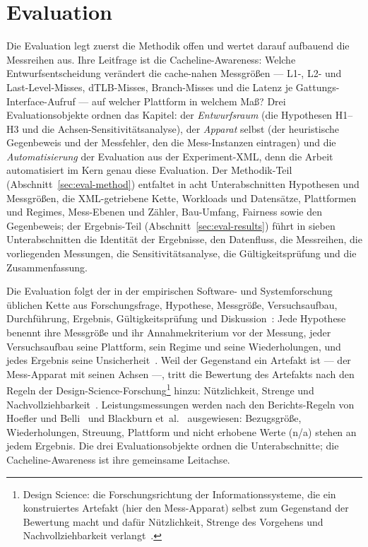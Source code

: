 \chapter{Evaluation}\label{ch:eval}

\begin{nurlang}
Die Evaluation legt zuerst die Methodik offen und wertet darauf aufbauend die Messreihen aus. Ihre
Leitfrage ist die Cacheline-Awareness: Welche Entwurfsentscheidung verändert die cache-nahen
Messgrößen --- L1-, L2- und Last-Level-Misses, dTLB-Misses, Branch-Misses und die Latenz je
Gattungs-Interface-Aufruf --- auf welcher Plattform in welchem Maß? Drei Evaluationsobjekte ordnen das
Kapitel: der \emph{Entwurfsraum} (die Hypothesen H1--H3 und die Achsen-Sensitivitätsanalyse), der
\emph{Apparat} selbst (der heuristische Gegenbeweis und der Messfehler, den die Mess-Instanzen
eintragen) und die \emph{Automatisierung} der Evaluation aus der Experiment-XML, denn die Arbeit
automatisiert im Kern genau diese Evaluation. Der Methodik-Teil (Abschnitt~\ref{sec:eval-method})
entfaltet in acht Unterabschnitten Hypothesen und Messgrößen, die XML-getriebene Kette, Workloads und
Datensätze, Plattformen und Regimes, Mess-Ebenen und Zähler, Bau-Umfang, Fairness sowie den
Gegenbeweis; der Ergebnis-Teil (Abschnitt~\ref{sec:eval-results}) führt in sieben Unterabschnitten
die Identität der Ergebnisse, den Datenfluss, die Messreihen, die vorliegenden Messungen, die
Sensitivitätsanalyse, die Gültigkeitsprüfung und die Zusammenfassung.

Die Evaluation folgt der in der empirischen Software- und Systemforschung üblichen Kette aus
Forschungsfrage, Hypothese, Messgröße, Versuchsaufbau, Durchführung, Ergebnis, Gültigkeitsprüfung
und Diskussion~\cite{wohlin2012experimentation,shaw2003writing}: Jede Hypothese benennt ihre
Messgröße und ihr Annahmekriterium vor der Messung, jeder Versuchsaufbau seine Plattform, sein Regime
und seine Wiederholungen, und jedes Ergebnis seine
Unsicherheit~\cite{georges2007rigorous,kalibera2013rigorous}. Weil der Gegenstand ein Artefakt ist ---
der Mess-Apparat mit seinen Achsen ---, tritt die Bewertung des Artefakts nach den Regeln der
Design-Science-Forschung\footnote{Design Science: die Forschungsrichtung der Informationssysteme, die
ein konstruiertes Artefakt (hier den Mess-Apparat) selbst zum Gegenstand der Bewertung macht und dafür
Nützlichkeit, Strenge des Vorgehens und Nachvollziehbarkeit verlangt~\cite{hevner2004designscience}.}
hinzu: Nützlichkeit, Strenge und
Nachvollziehbarkeit~\cite{hevner2004designscience,peffers2007dsrm,wieringa2014designscience}.
Leistungsmessungen werden nach den Berichts-Regeln von Hoefler und Belli~\cite{hoefler2015benchmarking}
und Blackburn et~al.~\cite{blackburn2016truth} ausgewiesen: Bezugsgröße, Wiederholungen, Streuung,
Plattform und nicht erhobene Werte (n/a) stehen an jedem Ergebnis. Die drei Evaluationsobjekte ordnen
die Unterabschnitte; die Cacheline-Awareness ist ihre gemeinsame Leitachse.


\end{nurlang}
